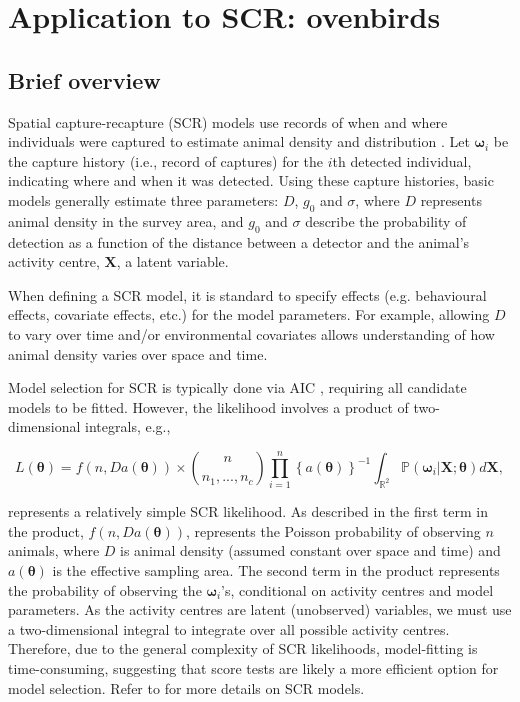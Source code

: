 \documentclass{article}
\newcommand{\lrbr}[1]{\left\{ #1 \right\}}
\begin{document}
\section{Application to SCR: ovenbirds}
\label{sec:ovenbirds}

\subsection{Brief overview}
\label{sec:scr-overview}

Spatial capture-recapture (SCR) models use records of when and where
individuals were captured to estimate
animal density and distribution \parencite{borchersEfford2008}. Let
$\boldsymbol{\omega}_i$ be the capture history (i.e., record of
captures) for the $i$th detected individual, indicating where and when
it was detected. Using these capture histories, basic models generally
estimate three parameters: $D$, $g_0$ and $\sigma$, where $D$
represents animal density in the survey area, and $g_0$ and $\sigma$ describe
the probability of detection as a function of the distance between a
detector and the animal's activity centre, $\boldsymbol{X}$, a latent variable. 

When defining a SCR model, it is standard to specify effects
(e.g. behavioural effects, covariate effects, etc.) for the model
parameters. For example, allowing $D$ to vary over time and/or
environmental covariates allows understanding of how animal density varies
over space and time.

Model selection for SCR is typically done via AIC
\parencite{efford-schofield}, requiring all candidate models to be
fitted. However, the likelihood involves a product of two-dimensional
integrals, e.g., 

\begin{equation*} \label{eq:scr-lik}
L(\boldsymbol{\theta}) = %
f(n, Da(\boldsymbol{\theta}))
\times \binom{n}{n_1,...,n_c}
\prod_{i=1}^n \lrbr{a(\boldsymbol{\theta})}^{-1} \int_{\mathbb{R}^2}
  \mathbb{P}(\boldsymbol{\omega}_i | \boldsymbol{X}; \boldsymbol{\theta}) d
  \boldsymbol{X},
\end{equation*}

represents a relatively simple SCR likelihood. As described in
\textcite{borchersEfford2008} the first term in the product, $f(n,
Da(\boldsymbol{\theta}))$, 
represents the Poisson probability of observing $n$ animals, where $D$
is animal density (assumed constant over space and time)
and $a(\boldsymbol{\theta})$ is the effective sampling
area. The second term in the product represents the 
probability of observing the $\boldsymbol{\omega}_i$'s, conditional
on activity centres and model parameters. As the activity centres
are latent (unobserved) variables, we must use a two-dimensional
integral to integrate over all possible activity centres. Therefore,
due to the general complexity of SCR likelihoods, model-fitting is   
time-consuming, suggesting that score tests are likely a more
efficient option for model selection. Refer to \textcite{secr-book}
for more details on SCR models. 
\end{document}
